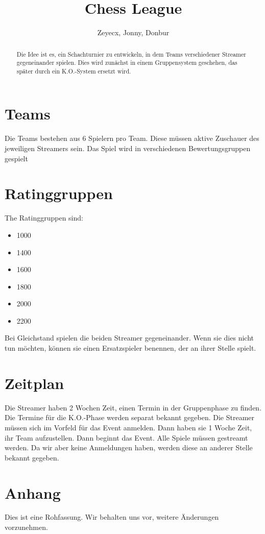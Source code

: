\documentclass{article}
\title{Chess League}
\author{Zeyecx, Jonny, Donbur}
\begin{document}
	\maketitle
	 
\begin{abstract}
	Die Idee ist es, ein Schachturnier zu entwickeln, in dem Teams verschiedener Streamer gegeneinander spielen.
	Dies wird zunächst in einem Gruppensystem geschehen, das später durch ein K.O.-System ersetzt wird. 
\end{abstract}


\section{Teams}
Die Teams bestehen aus 6 Spielern pro Team. Diese müssen aktive Zuschauer des jeweiligen Streamers sein. 
Das Spiel wird in verschiedenen Bewertungsgruppen gespielt

\section{Ratinggruppen}

The Ratinggruppen sind:
\begin{itemize}
	\item 1000
	\item 1400 
	\item 1600
	\item 1800
	\item 2000
	\item 2200
\end{itemize}
Bei Gleichstand spielen die beiden Streamer gegeneinander. Wenn sie dies nicht tun möchten, können sie einen Ersatzspieler benennen, der an ihrer Stelle spielt.

\section{Zeitplan}
Die Streamer haben 2 Wochen Zeit, einen Termin in der Gruppenphase zu finden. Die Termine für die K.O.-Phase werden separat bekannt gegeben.
Die Streamer müssen sich im Vorfeld für das Event anmelden. Dann haben sie 1 Woche Zeit, ihr Team aufzustellen.
Dann beginnt das Event.
Alle Spiele müssen gestreamt werden.
Da wir aber keine Anmeldungen haben, werden diese an anderer Stelle bekannt gegeben.

\section{Anhang}
Dies ist eine Rohfassung. Wir behalten uns vor, weitere Änderungen vorzunehmen.
	
\end{document}
